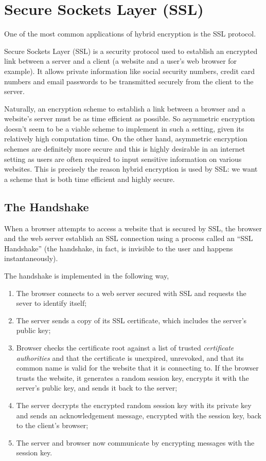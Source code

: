 \section{Secure Sockets Layer (SSL)}

One of the most common applications of hybrid encryption is the SSL protocol.

Secure Sockets Layer (SSL) is a security protocol used to establish an encrypted link between a server and a client (a website and a user's web browser for example). It allows private information like social security numbers, credit card numbers and email passwords to be transmitted securely from the client to the server.

Naturally, an encryption scheme to establish a link between a browser and a website's server must be as time efficient as possible. So asymmetric encryption doesn't seem to be a viable scheme to implement in such a setting, given its relatively high computation time. On the other hand, asymmetric encryption schemes are definitely more secure and this is highly desirable in an internet setting as users are often required to input sensitive information on various websites. This is precisely the reason hybrid encryption is used by SSL: we want a scheme that is both time efficient and highly secure.

\subsection{The Handshake}

\cite{digicert}When a browser attempts to access a website that is secured by SSL, the browser and the web server establish an SSL connection using a process called an “SSL Handshake” (the handshake, in fact, is invisible to the user and happens instantaneously).

The handshake is implemented in the following way,
\begin{enumerate}
\item The browser connects to a web server secured with SSL and requests the sever to identify itself;
\item The server sends a copy of its SSL certificate, which includes the server's public key;
\item Browser checks the certificate root against a list of trusted \textit{certificate authorities} and that the certificate is unexpired, unrevoked, and that its common name is valid for the website that it is connecting to. If the browser trusts the website, it generates a random session key, encrypts it with the server's public key, and sends it back to the server;
\item The server decrypts the encrypted random session key with its private key and sends an acknowledgement message, encrypted with the session key, back to the client's browser;
\item The server and browser now communicate by encrypting messages with the session key.
\end{enumerate}  %


